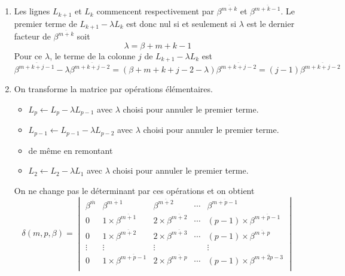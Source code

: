 \begin{enumerate}
\begin{enumerate}
 \item Les lignes $L_{k+1}$ et $L_k$ commencent respectivement par $\beta^{\overline{m+k}}$ et $\beta^{\overline{m+k-1}}$. Le premier terme de  $L_{k+1} -\lambda L_k$ est donc nul si et seulement si $\lambda$ est le dernier facteur de $\beta^{\overline{m+k}}$ soit
\begin{displaymath}
 \lambda = \beta + m +k-1
\end{displaymath}
Pour ce $\lambda$, le terme de la colonne $j$ de $L_{k+1} -\lambda L_k$ est
\begin{displaymath}
\beta^{\overline{m+k+j-1}}-\lambda \beta^{\overline{m+k+j-2}}
=(\beta+m+k+j-2-\lambda)\beta^{\overline{m+k+j-2}} = (j-1)\beta^{\overline{m+k+j-2}}
\end{displaymath}

 \item On transforme la matrice par opérations élémentaires.
\begin{itemize}
 \item $L_p \leftarrow L_p - \lambda L_{p-1}$ avec $\lambda$ choisi pour annuler le premier terme. 
 \item $L_{p-1} \leftarrow L_{p-1} - \lambda L_{p-2}$ avec $\lambda$ choisi pour annuler le premier terme.
 \item de même en remontant
 \item $L_{2} \leftarrow L_{2} - \lambda L_{1}$ avec $\lambda$ choisi pour annuler le premier terme.
\end{itemize}
On ne change pas le déterminant par ces opérations et on obtient 
\begin{displaymath}
\delta(m,p,\beta)=
 \begin{vmatrix}
\beta^{\overline{m}} & \beta^{\overline{m+1}}         & \beta^{\overline{m+2}}         & \cdots &\beta^{\overline{m+p-1}}\\
0         & 1\times \beta^{\overline{m+1}} & 2\times \beta^{\overline{m+2}} & \cdots &(p-1)\times \beta^{\overline{m+p-1}}\\   
0         & 1\times \beta^{\overline{m+2}} & 2\times \beta^{\overline{m+3}} & \cdots &(p-1)\times \beta^{\overline{m+p}}\\
\vdots    & \vdots                         & \vdots                         &        &\vdots        \\
0         & 1\times \beta^{\overline{m+p-1}} & 2\times \beta^{\overline{m+p}} & \cdots &(p-1)\times \beta^{\overline{m+2p-3}}\\
 \end{vmatrix}

\end{displaymath}
\end{enumerate}
\end{enumerate}
